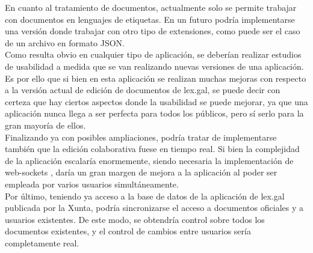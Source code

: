 En cuanto al tratamiento de documentos, actualmente solo se permite trabajar con documentos en lenguajes de etiquetas. En un futuro podría implementarse una versión donde trabajar con otro tipo de extensiones, como puede ser el caso de un archivo en formato JSON.
\\

Como resulta obvio en cualquier tipo de aplicación, se deberían realizar estudios de usabilidad a medida que se van realizando nuevas versiones de una aplicación. Es por ello que si bien en esta aplicación se realizan muchas mejoras con respecto a la versión actual de edición de documentos de lex.gal, se puede decir con certeza que hay ciertos aspectos donde la usabilidad se puede mejorar, ya que una aplicación nunca llega a ser perfecta para todos los públicos, pero sí serlo para la gran mayoría de ellos.
\\

Finalizando ya con posibles ampliaciones, podría tratar de implementarse también que la edición colaborativa fuese en tiempo real. Si bien la complejidad de la aplicación escalaría enormemente, siendo necesaria la implementación de web-sockets \cite{websocket}, daría un gran margen de mejora a la aplicación al poder ser empleada por varios usuarios simultáneamente.
\\

Por último, teniendo ya acceso a la base de datos de la aplicación de lex.gal publicada por la Xunta, podría sincronizarse el acceso a documentos oficiales y a usuarios existentes. De este modo, se obtendría control sobre todos los documentos existentes, y el control de cambios entre usuarios sería completamente real.